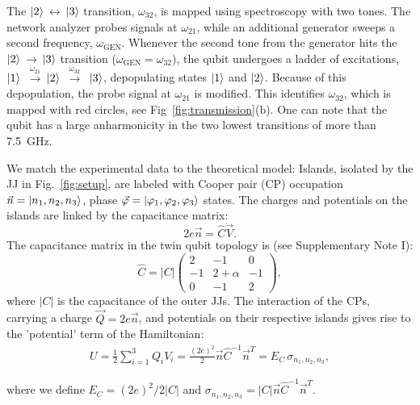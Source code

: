 \documentclass[%
reprint,
superscriptaddress,
bibnotes,
amsmath,
amssymb,
aps,
showkeys,
prb,
]{revtex4-1}
\newcommand{\iket}[1]{\ensuremath{\Ket{#1}}}
\newcommand{\ira}{\ensuremath{\,\rightarrow\,}}
\newcommand{\ilra}{\ensuremath{\,\leftrightarrow\,}}
\newcommand{\iabs}[1]{\ensuremath{\left|#1\right|}}
\newcommand{\iratext}[1]{\ensuremath{\,\xrightarrow{\text{#1}}\,}}
\begin{document}
The  \iket{2}\ilra\iket{3}  transition,  $\omega_{32}$,   is  mapped  using
spectroscopy with two tones. The network  analyzer probes  signals at  $ \omega_{21}  $, while  an
additional generator  sweeps a second  frequency, $ \omega_{\text{GEN}}  $.  Whenever
the second tone from the generator hits the \iket{2}\ira\iket{3} transition
($\omega_{\text{GEN}}  = \omega_{32}  $), the  qubit  undergoes a  ladder of  excitations,
\iket{1}  \iratext{$\omega_{21}$}\iket{2}  \iratext{$\omega_{32}$} \iket{3},  depopulating
states \iket{1} and \iket{2}.  Because of this depopulation, the probe signal at $\omega_{21}$ is
modified.
This identifies  $\omega_{32}$, which  is mapped  with red  circles, see Fig~\ref{fig:transmission}(b).
One can note that the qubit has a large anharmonicity in the two lowest transitions of more than 7.5~GHz.

We match the  experimental data to the theoretical model: Islands,  isolated by the
JJ  in  Fig.~\ref{fig:setup},  are  labeled with  Cooper  pair  (CP)  occupation
$       \vec{n}      =       \iket{n_1,      n_2,       n_3}      $,       phase
$     \vec{\varphi}     =     \iket{\varphi_1,     \varphi_2,     \varphi_3}     $  states.  The charges and potentials on
the islands are linked by the capacitance matrix:
\begin{equation}
  \label{eq:link}
  2e\vec{n} = \hat{C}\vec{V}.
\end{equation}
The capacitance matrix in the twin qubit topology is (see Supplementary Note I):
\begin{equation}
  \hat{C} = \iabs{C} \begin{pmatrix}
    2  &  -1  &  0\\
    -1  &  2  +  \alpha  &  -1\\
    0  &  -1  & 2
  \end{pmatrix},
  \label{eq:capac}
\end{equation}
where \iabs{C}  is the capacitance of the outer  JJs.  The interaction
of the  CPs, carrying a  charge $ \vec{Q}=2e\vec{n}  $, and potentials  on their
respective islands gives rise to the 'potential' term of the Hamiltonian:
\begin{equation}\label{eq:potential}
  \begin{aligned}
    U = \frac{1}{2}\sum_{i=1}^{3}Q_iV_i =
    \frac{(2e)^2}{2}\vec{n}\hat{C}^{-1}\vec{n}^{T} = E_C\,\sigma_{n_1, n_2, n_3},
  \end{aligned}
\end{equation}

\noindent where we define $ E_{C}={(2e)^{2}}/{2 \iabs{C} } $ and $\sigma_{n_1, n_2, n_3} = \iabs{C}\vec{n}\hat{C}^{-1}\vec{n}^{T}$.
\end{document}
